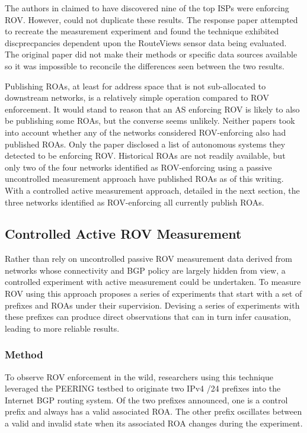 \documentclass[sigconf]{acmart}
\begin{document}
The authors in \cite{gilad_are_2017} claimed to have discovered nine of
the top ISPs were enforcing ROV.  However, \cite{reuter_towards_2018}
could not duplicate these results.  The response paper attempted to
recreate the measurement experiment and found the technique exhibited
discprecpancies dependent upon the RouteViews sensor data being
evaluated.  The original paper did not make their methods or specific
data sources available so it was impossible to reconcile the differences
seen between the two results.

Publishing ROAs, at least for address space that is not sub-allocated to
downstream networks, is a relatively simple operation compared to ROV
enforcement.  It would stand to reason that an AS enforcing ROV is
likely to also be publishing some ROAs, but the converse seems unlikely.
Neither papers took into account whether any of the networks considered
ROV-enforcing also had published ROAs.  Only
the\cite{reuter_towards_2018} paper disclosed a list of autonomous
systems they detected to be enforcing ROV.  Historical ROAs are not
readily available, but only two of the four networks identified as
ROV-enforcing using a passive uncontrolled measurement approach have
published ROAs as of this writing.  With a controlled active
measurement approach, detailed in the next section, the three networks
identified as ROV-enforcing all currently publish ROAs.

\subsection{Controlled Active ROV Measurement}

Rather than rely on uncontrolled passive ROV measurement data derived
from networks whose connectivity and BGP policy are largely hidden from
view, a controlled experiment with active measurement could be
undertaken.  To measure ROV using this approach
\cite{reuter_towards_2018} proposes a series of experiments that start
with a set of prefixes and ROAs under their supervision.  Devising a
series of experiments with these prefixes can produce direct
observations that can in turn infer causation, leading to more reliable
results.

\subsubsection{Method}

To observe ROV enforcement in the wild, researchers using this technique
leveraged the PEERING testbed to originate two IPv4 /24 prefixes into
the Internet BGP routing system.\cite{schlinker_peering:_2014}  Of the
two prefixes announced, one is a control prefix and always has a valid
associated ROA.  The other prefix oscillates between a valid and invalid
state when its associated ROA changes during the experiment.
\end{document}
